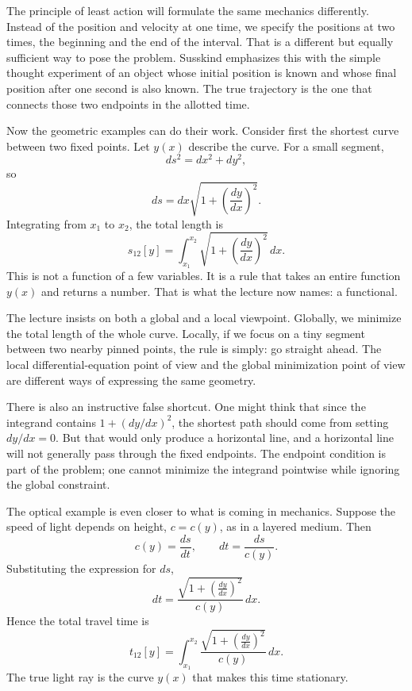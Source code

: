 The principle of least action will formulate the same mechanics differently. Instead of the position and velocity at one time, we specify the positions at two times, the beginning and the end of the interval. That is a different but equally sufficient way to pose the problem. Susskind emphasizes this with the simple thought experiment of an object whose initial position is known and whose final position after one second is also known. The true trajectory is the one that connects those two endpoints in the allotted time.

Now the geometric examples can do their work. Consider first the shortest curve between two fixed points. Let \(y(x)\) describe the curve. For a small segment,
\begin{equation}
ds^2=dx^2+dy^2,
\end{equation}
so
\begin{equation}
ds=dx\sqrt{1+\left(\frac{dy}{dx}\right)^2}.
\end{equation}
Integrating from \(x_1\) to \(x_2\), the total length is
\begin{equation}
s_{12}[y]
=
\int_{x_1}^{x_2}
\sqrt{1+\left(\frac{dy}{dx}\right)^2}\,dx.
\end{equation}
This is not a function of a few variables. It is a rule that takes an entire function \(y(x)\) and returns a number. That is what the lecture now names: a functional.

The lecture insists on both a global and a local viewpoint. Globally, we minimize the total length of the whole curve. Locally, if we focus on a tiny segment between two nearby pinned points, the rule is simply: go straight ahead. The local differential-equation point of view and the global minimization point of view are different ways of expressing the same geometry.

There is also an instructive false shortcut. One might think that since the integrand contains \(1+(dy/dx)^2\), the shortest path should come from setting \(dy/dx=0\). But that would only produce a horizontal line, and a horizontal line will not generally pass through the fixed endpoints. The endpoint condition is part of the problem; one cannot minimize the integrand pointwise while ignoring the global constraint.

The optical example is even closer to what is coming in mechanics. Suppose the speed of light depends on height, \(c=c(y)\), as in a layered medium. Then
\begin{equation}
c(y)=\frac{ds}{dt},
\qquad
dt=\frac{ds}{c(y)}.
\end{equation}
Substituting the expression for \(ds\),
\begin{equation}
dt
=
\frac{\sqrt{1+\left(\frac{dy}{dx}\right)^2}}{c(y)}\,dx.
\end{equation}
Hence the total travel time is
\begin{equation}
t_{12}[y]
=
\int_{x_1}^{x_2}
\frac{\sqrt{1+\left(\frac{dy}{dx}\right)^2}}{c(y)}\,dx.
\end{equation}
The true light ray is the curve \(y(x)\) that makes this time stationary.

